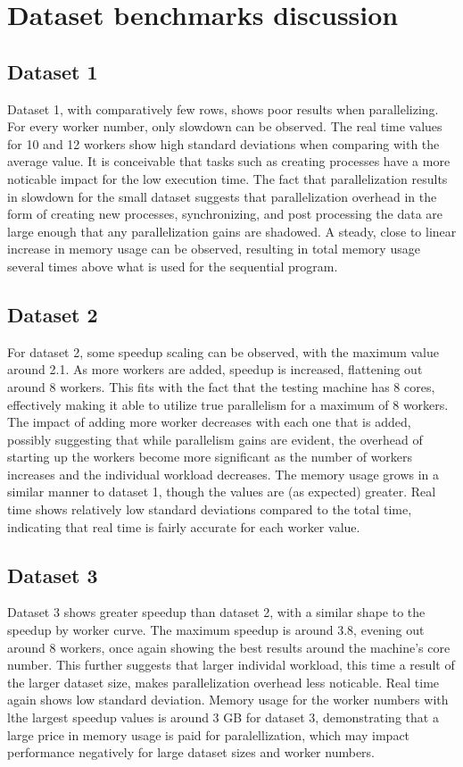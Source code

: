 \section{Dataset benchmarks discussion}
\subsection{Dataset 1}
Dataset 1, with comparatively few rows, shows poor results when parallelizing. For every worker number, only slowdown can be observed.
The real time values for 10 and 12 workers show high standard deviations when comparing with the average value. It is conceivable that
tasks such as creating processes have a more noticable impact for the low execution time. The fact that parallelization results in
slowdown for the small dataset suggests that parallelization overhead in the form of creating new processes, synchronizing, and
post processing the data are large enough that any parallelization gains are shadowed.
A steady, close to linear increase in memory usage can be observed, resulting in total memory usage several times above what is
used for the sequential program. 

\subsection{Dataset 2}
For dataset 2, some speedup scaling can be observed, with the maximum value around 2.1. As more workers are added, speedup is increased,
flattening out around 8 workers. This fits with the fact that the testing machine has 8 cores, effectively making it able to utilize 
true parallelism for a maximum of 8 workers. The impact of adding more worker decreases with each one that is added, possibly suggesting
that while parallelism gains are evident, the overhead of starting up the workers become more significant as the number of workers increases
and the individual workload decreases. The memory usage grows in a similar manner to dataset 1, though the values are (as expected) greater.
Real time shows relatively low standard deviations compared to the total time, indicating that real time is fairly accurate for each worker
value.

\subsection{Dataset 3}
Dataset 3 shows greater speedup than dataset 2, with a similar shape to the speedup by worker curve. The maximum speedup is
around 3.8, evening out around 8 workers, once again showing the best results around the machine's core number. This further suggests that larger
individal workload, this time a result of the larger dataset size, makes parallelization overhead less noticable. Real time again shows
low standard deviation. Memory usage for the worker numbers with lthe largest speedup values is around 3 GB for dataset 3, demonstrating
that a large price in memory usage is paid for paralellization, which may impact performance negatively for large dataset sizes and
worker numbers.

